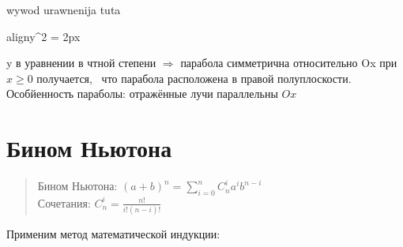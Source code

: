 \documentclass[oneside]{book}
\newcommand{\boxedeq}[2]{\begin{empheq}[box={\fboxsep=6pt\fbox}]{align}\label{#1}#2\end{empheq}}
\begin{document}
\begin{enumerate}
\begin{center}
    wywod urawnenija tuta

    \boxedeq{eq:*}{y^2 = \pm 2px}
\end{center}
y в уравнении в чтной степени $\Rightarrow$ парабола симметрична относительно Ox при $x \geq 0$ получается, \
что парабола расположена в правой полуплоскости. Особйенность параболы: отражённые лучи параллельны $Ox$

\chapter{Бином Ньютона\\}
\begin{quote}
	Бином Ньютона:
	$(a+b)^n=\sum\limits_{i=0}^nC_{n}^ia^ib^{n-i}$\\
	Сочетания: $C_{n}^i= \frac{n!}{i!(n-i)!} $
\end{quote}
Применим метод математической индукции:


\end{enumerate}
\end{document}
